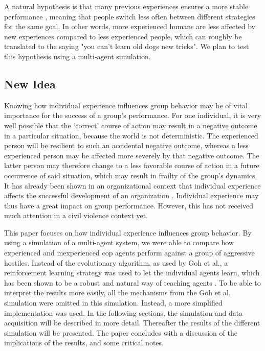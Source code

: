 A natural hypothesis is that many previous experiences ensures a more stable performance \citep{anderson2007mind,nason2005soar}, meaning that people switch less often between different strategies for the same goal. In other words, more experienced humans are less affected by new experiences compared to less experienced people, which can roughly be translated to the saying "you can't learn old dogs new tricks". We plan to test this hypothesis using a multi-agent simulation.

\subsection{New Idea}
Knowing how individual experience influences group behavior may be of vital importance for the success of a group's performance.
For one individual, it is very well possible that the `correct' course of action may result in a negative outcome in a particular situation, because the world is not deterministic.
The experienced person will be resilient to such an accidental negative outcome, whereas a less experienced person may be affected more severely by that negative outcome.
The latter person may therefore change to a less favorable course of action in a future occurrence of said situation, which may result in frailty of the group's dynamics.
It has already been shown in an organizational context that individual experience affects the successful development of an organization \citep*{reagans2005individual}.
Individual experience may thus have a great impact on group performance.
However, this has not received much attention in a civil violence context yet.

This paper focuses on how individual experience influences group behavior.
 By using a simulation of a multi-agent system, we were able to compare how experienced and inexperienced cop agents perform against a group of aggressive hostiles. Instead of the evolutionary algorithm, as used by Goh et al., a reinforcement learning strategy was used to let the individual agents learn, which has been shown to be a robust and natural way of teaching agents \citep{claus1998dynamics}. To be able to interpret the results more easily, all the mechanisms from the Goh et al. simulation were omitted in this simulation. Instead, a more simplified implementation was used. In the following sections, the simulation and data acquisition will be described in more detail.
 Thereafter the results of the different simulation will be presented.
 The paper concludes with a discussion of the implications of the results, and some critical notes.
 
